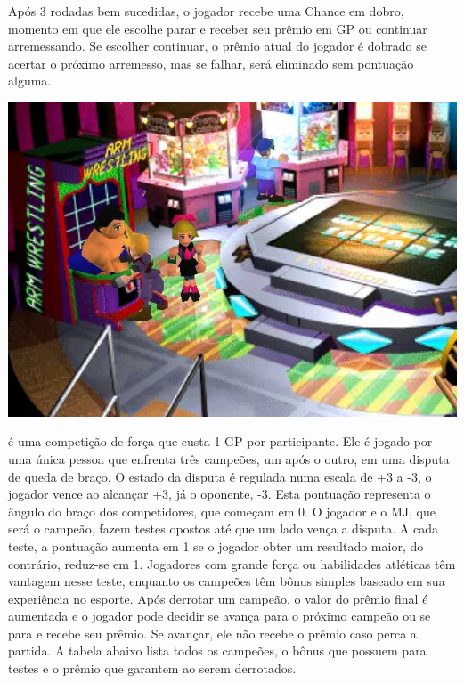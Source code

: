Após 3 rodadas bem sucedidas, o jogador recebe uma Chance em dobro, momento em que ele escolhe parar e receber seu prêmio em GP ou continuar arremessando. Se escolher continuar, o prêmio atual do jogador é dobrado se acertar o próximo arremesso, mas se falhar, será eliminado sem pontuação alguma.
%
\vfill
%
%
\vfill
%
%
%
%
\begin{center} \includegraphics[width=\columnwidth]{./art/goldsaucer/armwrestling.jpg} \end{center}
 é uma competição de força que custa 1 GP por participante. 
Ele é jogado por uma única pessoa que enfrenta três campeões, um após o outro, em uma disputa de queda de braço.
O estado da disputa é regulada numa escala de +3 a -3, o jogador vence ao alcançar +3, já o oponente, -3.
Esta pontuação representa o ângulo do braço dos competidores, que começam em 0.
O jogador e o MJ, que será o campeão, fazem testes opostos até que um lado vença a disputa.
A cada teste, a pontuação aumenta em 1 se o jogador obter um resultado maior, do contrário, reduz-se em 1.
Jogadores com grande força ou habilidades atléticas têm vantagem nesse teste, enquanto os campeões têm bônus simples baseado em sua experiência no esporte.
Após derrotar um campeão, o valor do prêmio final é aumentada e o jogador pode decidir se avança para o próximo campeão ou se para e recebe seu prêmio.
Se avançar, ele não recebe o prêmio caso perca a partida. A tabela abaixo lista todos os campeões, o bônus que possuem para testes e o prêmio que garantem ao serem derrotados.
%
\\\\
